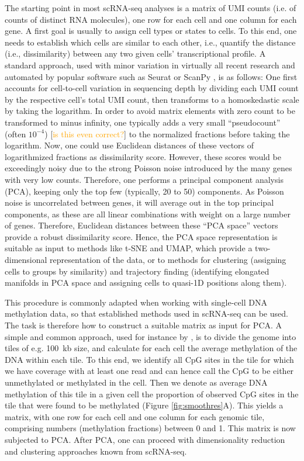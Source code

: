\documentclass[twocolumn,10pt]{article}
\newcommand{\todo}[1]{[\textcolor{orange}{#1}]}
\begin{document}
The starting point in most scRNA-seq analyses is a matrix of UMI counts (i.e.
of counts of distinct RNA molecules), one row for each cell and one column for each gene.
A first goal is usually to assign cell types or states to cells.
To this end, one needs to establish which cells are similar to each other, i.e., quantify the distance (i.e., dissimilarity) between any two given cells' transcriptional profile.
A standard approach, used with minor variation in virtually all recent research and automated by popular software such as Seurat \citep{Hao_2021} or ScanPy \citep{Wolf_2018}, is as follows: One first accounts for cell-to-cell variation in sequencing depth by dividing each UMI count by the respective cell's total UMI count, then transforms to a homoskedastic scale by taking the logarithm.
In order to avoid matrix elements with zero count to be transformed to minus infinity, one typically adds a very small ``pseudocount'' (often $10^{-4}$) \todo{is this even correct?} to the normalized fractions before taking the logarithm.
Now, one could use Euclidean distances of these vectors of logarithmized fractions as dissimilarity score.
However, these scores would be exceedingly noisy due to the strong Poisson noise introduced by the many genes with very low counts.
Therefore, one performs a principal component analysis (PCA), keeping only the top few (typically, 20 to 50) components.
As Poisson noise is uncorrelated between genes, it will average out in the top principal components, as these are all linear combinations with weight on a large number of genes.
Therefore, Euclidean distances between these ``PCA space'' vectors provide a robust dissimilarity score.
Hence, the PCA space representation is suitable as input to methods like t-SNE and UMAP, which provide a two-dimensional representation of the data, or to methods for clustering (assigning cells to groups by similarity) and trajectory finding (identifying elongated manifolds in PCA space and assigning cells to quasi-1D positions along them).

This procedure is commonly adapted when working with single-cell DNA methylation data, so that established methods used in scRNA-seq can be used.
The task is therefore how to construct a suitable matrix as input for PCA.
A simple and common approach, used for instance by \citet{luo2017single}, is to divide the genome into tiles of e.g. 100~kb size, and calculate for each cell the average methylation of the DNA within each tile.
To this end, we identify all CpG sites in the tile for which we have coverage with at least one read and can hence call the CpG to be either unmethylated or methylated in the cell.
Then we denote as average DNA methylation of this tile in a given cell the proportion of observed CpG sites in the tile that were found to be methylated (Figure \ref{fig:smoothres}A).
This yields a matrix, with one row for each cell and one column for each genomic tile, comprising numbers (methylation fractions) between 0 and 1.
This matrix is now subjected to PCA.
After PCA, one can proceed with dimensionality reduction and clustering approaches known from scRNA-seq.
\end{document}

